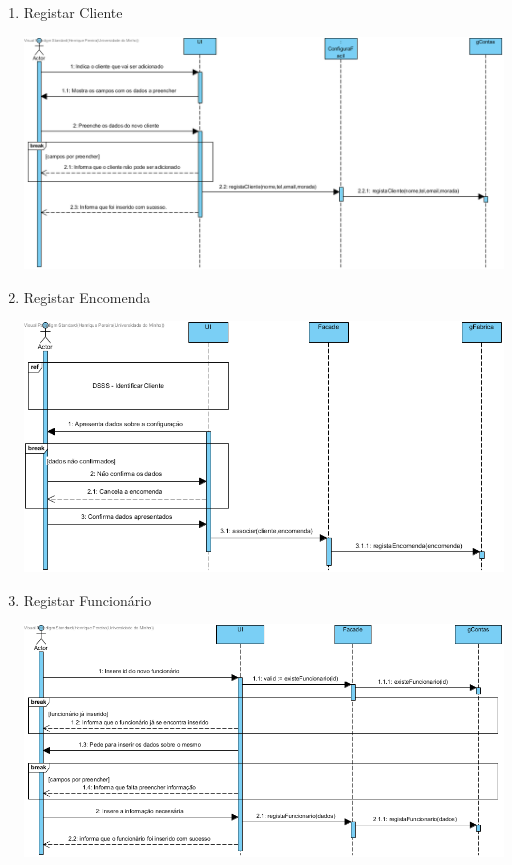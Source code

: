 \documentclass[11pt]{article} %
\begin{document}
\begin{enumerate}
\begin{center}
		\end{center}
	\item Registar Cliente
		\begin{center}
 			\includegraphics[width = 6in]{dsss_registar_cliente.png}
		\end{center}
	\item Registar Encomenda
		\begin{center}
 			\includegraphics[width = 6in]{dsss_registar_encomenda.png}
		\end{center}
	\item Registar Funcionário
		\begin{center}
 			\includegraphics[width = 6in]{dsss_registar_funcionario.png}

\end{center}
\end{enumerate}
\end{document}
